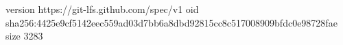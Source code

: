 version https://git-lfs.github.com/spec/v1
oid sha256:4425e9cf5142eec559ad03d7bb6a8dbd92815cc8c517008909bfdc0e98728fae
size 3283
